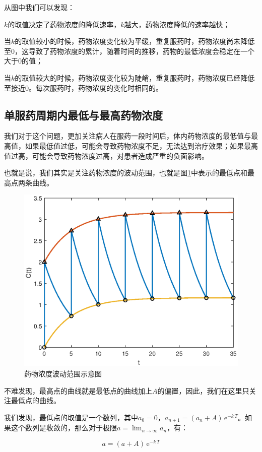 \documentclass[12pt,AutoFakeSlant,AutoFakeBold]{article}
\begin{document}
从图中我们可以发现：

\begin{itemize*}
    \item $k$的取值决定了药物浓度的降低速率，$k$越大，药物浓度降低的速率越快；
    \item 当$k$的取值较小的时候，药物浓度变化较为平缓，重复服药时，药物浓度尚未降低至0，这导致了药物浓度的累计，随着时间的推移，药物的最低浓度会稳定在一个大于0的值；
    \item 当$k$的取值较大的时候，药物浓度变化较为陡峭，重复服药时，药物浓度已经降低至接近0。每次服药时，药物浓度的变化时相同的。
\end{itemize*}

\subsection{单服药周期内最低与最高药物浓度}

我们对于这个问题，更加关注病人在服药一段时间后，体内药物浓度的最低值与最高值，如果最低值过低，可能会导致药物浓度不足，无法达到治疗效果；如果最高值过高，可能会导致药物浓度过高，对患者造成严重的负面影响。

也就是说，我们其实是关注药物浓度的波动范围，也就是图\ref{fig:上下限}中表示的最低点和最高点两条曲线。

\begin{figure}[!ht]
    \centering
    \includegraphics[width=0.5\linewidth]{上下限.eps}
    \caption{药物浓度波动范围示意图}
    \label{fig:上下限}
\end{figure}

不难发现，最高点的曲线就是最低点的曲线加上$A$的偏置，因此，我们在这里只关注最低点的曲线。

我们发现，最低点的取值是一个数列，其中$a_0 = 0$，$a_{n+1} = (a_n + A)\,\mathrm{e}^{-k\,T}$。如果这个数列是收敛的，那么对于极限$a = \lim_{n\to\infty} a_n$，有：

\begin{equation}
    a = (a + A)\,\mathrm{e}^{-k\,T}
\end{equation}
\end{document}

